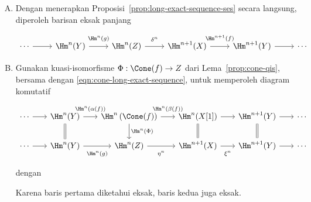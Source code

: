 \begin{enumerate}[(A)]
	\item Dengan menerapkan Proposisi~\ref{prop:long-exact-sequence-ses}
	secara langsung, diperoleh barisan eksak panjang
	\[\begin{tikzcd}
		\cdots \arrow[r] & \Hm^n(Y) \arrow[r, "{\Hm^n(g)}" inner sep=0.6em] & \Hm^n(Z) \arrow[r, "{\delta^n}" inner sep=0.6em] & \Hm^{n+1}(X) \arrow[r, "{\Hm^{n+1}(f)}" inner sep=0.6em] & \Hm^{n+1}(Y) \arrow[r] & \cdots
	\end{tikzcd}\]
	\item Gunakan kuasi-isomorfisme $\Phi:\Cone(f)\to Z$ dari
	Lema~\ref{prop:cone-qis}, bersama dengan
	\eqref{eqn:cone-long-exact-sequence}, untuk memperoleh diagram komutatif
	\[\begin{tikzcd}[column sep=scriptsize]
		\cdots \arrow[r] & \Hm^n(Y) \arrow[r, "{\Hm^n(\alpha(f))}" inner sep=0.6em] \arrow[equal, d] & \Hm^n\left( \Cone(f) \right) \arrow[r, "{\Hm^n(\beta(f))}" inner sep=0.6em] \arrow[d, "{\Hm^n(\Phi)}"] & \Hm^n(X[1]) \arrow[r] \arrow[equal, d] & \Hm^{n+1}(Y) \arrow[r] \arrow[equal, d] & \cdots \\
		\cdots \arrow[r] & \Hm^n(Y) \arrow[r, "{\Hm^n(g)}"' inner sep=0.6em] & \Hm^n(Z) \arrow[r, "{\eta^n}"' inner sep=0.6em] & \Hm^{n+1}(X) \arrow[r, "{\xi^n}"' inner sep=0.6em] & \Hm^{n+1}(Y) \arrow[r] & \cdots
	\end{tikzcd}\]
	dengan
	Karena baris pertama diketahui eksak, baris kedua juga eksak.


\end{enumerate}
